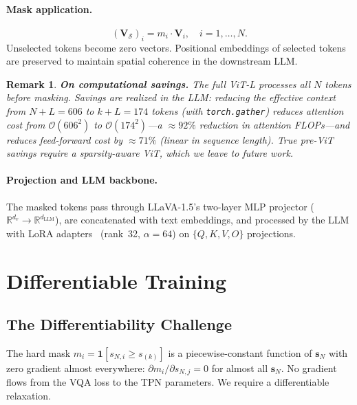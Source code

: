 \documentclass[11pt,a4paper]{article}
\newcommand{\R}{\mathbb{R}}
\newcommand{\vs}{\mathbf{s}}
\newcommand{\mV}{\mathbf{V}}
\newtheorem{remark}{Remark}
\begin{document}
\paragraph{Mask application.}
\begin{equation}
  (\mV_\mathcal{S})_i = m_i \cdot \mV_i, \quad i=1,\ldots,N.
  \label{eq:masking}
\end{equation}
Unselected tokens become zero vectors. Positional embeddings of selected tokens
are preserved to maintain spatial coherence in the downstream LLM.

\begin{remark}
  \label{rem:pre_vit}
  \textbf{On computational savings.}
  The full ViT-L processes all $N$ tokens before masking. Savings are realized
  in the LLM: reducing the effective context from $N{+}L{=}606$ to $k{+}L{=}174$
  tokens (with \texttt{torch.gather}) reduces attention cost from
  $\mathcal{O}(606^2)$ to $\mathcal{O}(174^2)$---a ${\approx}92\%$ reduction in
  attention FLOPs---and reduces feed-forward cost by ${\approx}71\%$ (linear in
  sequence length). True pre-ViT savings require a sparsity-aware ViT, which we
  leave to future work.
\end{remark}

\paragraph{Projection and LLM backbone.} The masked tokens pass through
LLaVA-1.5's two-layer MLP projector ($\R^{d_v}\to\R^{d_{\mathrm{LLM}}}$), are
concatenated with text embeddings, and processed by the LLM with LoRA
adapters~\citep{hu2022lora} (rank~32, $\alpha{=}64$) on $\{Q,K,V,O\}$ projections.

\section{Differentiable Training}
\label{sec:training}

\subsection{The Differentiability Challenge}
\label{subsec:diff_challenge}

The hard mask $m_i = \mathbf{1}[s_{N,i} \geq s_{(k)}]$ is a piecewise-constant
function of $\vs_N$ with zero gradient almost everywhere:
$\partial m_i / \partial s_{N,j} = 0$ for almost all $\vs_N$. No gradient
flows from the VQA loss to the TPN parameters. We require a differentiable
relaxation.
\end{document}
